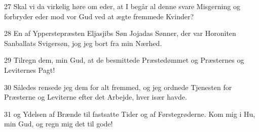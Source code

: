 \par 27 Skal vi da virkelig høre om eder, at I begår al denne svare Misgerning og forbryder eder mod vor Gud ved at ægte fremmede Kvinder?
\par 28 En af Ypperstepræsten Eljasjibs Søn Jojadas Sønner, der var Horoniten Sanballats Svigersøn, jog jeg bort fra min Nærhed.
\par 29 Tilregn dem, min Gud, at de besmittede Præstedømmet og Præsternes og Leviternes Pagt!
\par 30 Således rensede jeg dem for alt fremmed, og jeg ordnede Tjenesten for Præsterne og Leviterne efter det Arbejde, hver især havde.
\par 31 og Ydelsen af Brænde til fastsatte Tider og af Førstegrøderne. Kom mig i Hu, min Gud, og regn mig det til gode!


